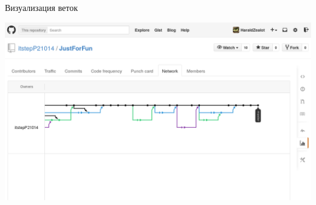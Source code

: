 \documentclass[xetex,14pt,serif,compress,hyperref={xetex}]{beamer}
\begin{document}
\begin{frame}{Визуализация веток}
\begin{center}
\includegraphics[scale=0.4,keepaspectratio]{snp44.png}
\end{center}
\end{frame}
\end{document}
